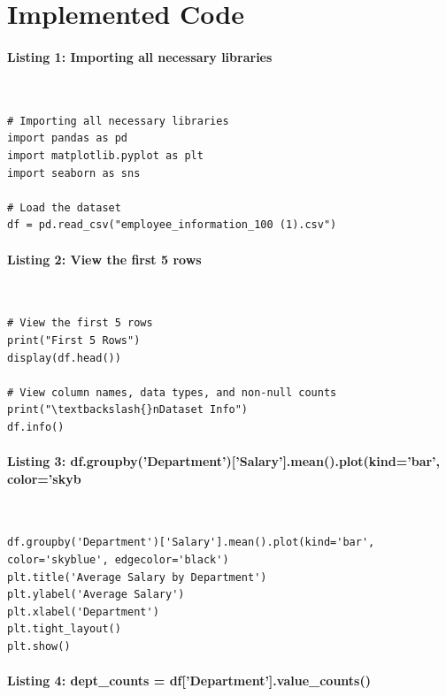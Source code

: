 \documentclass[12pt,a4paper,oneside]{report}
\begin{document}
\section{Implemented Code}
\paragraph{Listing 1: Importing all necessary libraries}\mbox{}\\[-1ex]
\begin{Verbatim}[commandchars=\\\{\},breaklines=true,breakanywhere=true,fontsize=\scriptsize,frame=leftline,framesep=2mm,rulecolor=\color{gray}]
# Importing all necessary libraries
import pandas as pd
import matplotlib.pyplot as plt
import seaborn as sns

# Load the dataset
df = pd.read_csv("employee_information_100 (1).csv")
\end{Verbatim}
\paragraph{Listing 2: View the first 5 rows}\mbox{}\\[-1ex]
\begin{Verbatim}[commandchars=\\\{\},breaklines=true,breakanywhere=true,fontsize=\scriptsize,frame=leftline,framesep=2mm,rulecolor=\color{gray}]
# View the first 5 rows
print("First 5 Rows")
display(df.head())

# View column names, data types, and non-null counts
print("\textbackslash{}nDataset Info")
df.info()
\end{Verbatim}
\paragraph{Listing 3: df.groupby('Department')['Salary'].mean().plot(kind='bar', color='skyb}\mbox{}\\[-1ex]
\begin{Verbatim}[commandchars=\\\{\},breaklines=true,breakanywhere=true,fontsize=\scriptsize,frame=leftline,framesep=2mm,rulecolor=\color{gray}]
df.groupby('Department')['Salary'].mean().plot(kind='bar', color='skyblue', edgecolor='black')
plt.title('Average Salary by Department')
plt.ylabel('Average Salary')
plt.xlabel('Department')
plt.tight_layout()
plt.show()
\end{Verbatim}
\paragraph{Listing 4: dept\_counts = df['Department'].value\_counts()}\mbox{}\\[-1ex]
\end{document}
